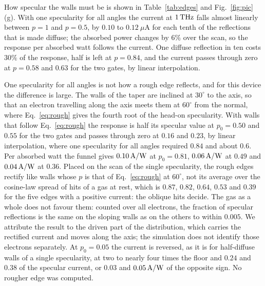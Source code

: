 How specular the walls must be is shown in Table~\ref{tab:edges} and
Fig.~\ref{fig:pic}(g). With one specularity for all angles the current
at $1\,\mathrm{THz}$ falls almost linearly between $p=1$ and $p=0.5$, by $0.10$ to
$0.12\ \mu$A for each tenth of the reflections that is made diffuse; the
absorbed power changes by $6\%$ over the scan, so the response per
absorbed watt follows the current. One diffuse reflection in ten costs
$30\%$ of the response, half is left at $p=0.84$, and the current passes
through zero at $p=0.58$ and $0.63$ for the two gates, by linear
interpolation.

One specularity for all angles is not how a rough edge reflects, and for
this device the difference is large. The walls of the taper are inclined
at $30^{\circ}$ to the axis, so that an electron travelling along the axis
meets them at $60^{\circ}$ from the normal, where Eq.~\eqref{eq:rough}
gives the fourth root of the head-on specularity. With walls that follow
Eq.~\eqref{eq:rough} the response is half its specular value at
$p_{0}=0.50$ and $0.55$ for the two gates and passes through zero at
$0.16$ and $0.23$, by linear interpolation, where one specularity for
all angles required $0.84$ and about $0.6$. Per absorbed watt the
funnel gives $0.10\,\mathrm{A/W}$ at $p_{0}=0.81$, $0.06\,\mathrm{A/W}$ at $0.49$ and
$0.04\,\mathrm{A/W}$ at $0.36$. Placed on the scan of the
single specularity, the rough edges rectify like walls whose $p$ is that
of Eq.~\eqref{eq:rough} at $60^{\circ}$, not its average over the
cosine-law spread of hits of a gas at rest, which is $0.87$, $0.82$,
$0.64$, $0.53$ and $0.39$ for the five edges with a positive current: the
oblique hits decide. The gas as a whole does not favour
them: counted over all electrons, the fraction of specular reflections
is the same on the sloping walls as on the others to within $0.005$. We
attribute the result to the driven part of the distribution, which
carries the rectified current and moves along the axis; the simulation
does not identify those electrons separately. At $p_{0}=0.05$ the
current is reversed, as it is for half-diffuse walls of a single
specularity, at two to nearly four times the floor and $0.24$ and
$0.38$ of the specular current, or $0.03$ and $0.05\,\mathrm{A/W}$ of the opposite
sign. No rougher edge was computed.

